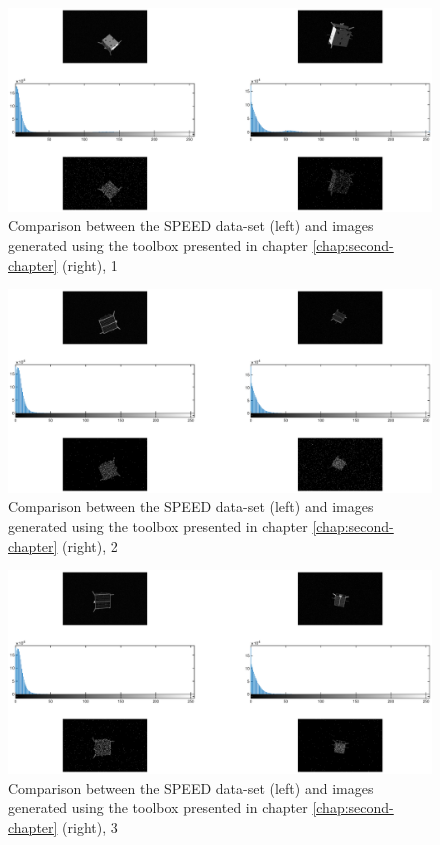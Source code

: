 \begin{figure}[htbp]
  \centering
  \includegraphics[width=1.0\textwidth]{gfx/comparison/comparison1.eps}
  \caption{Comparison between the SPEED data-set (left) and images generated using the toolbox presented in chapter \ref{chap:second-chapter} (right), 1}
  \label{fig:comparison1}
\end{figure}

\begin{figure}[htbp]
  \centering
  \includegraphics[width=1.0\textwidth]{gfx/comparison/comparison2.eps}
  \caption{Comparison between the SPEED data-set (left) and images generated using the toolbox presented in chapter \ref{chap:second-chapter} (right), 2}
  \label{fig:comparison2}
\end{figure}

\begin{figure}[htbp]
  \centering
  \includegraphics[width=1.0\textwidth]{gfx/comparison/comparison3.eps}
  \caption{Comparison between the SPEED data-set (left) and images generated using the toolbox presented in chapter \ref{chap:second-chapter} (right), 3}
  \label{fig:comparison3}
\end{figure}

